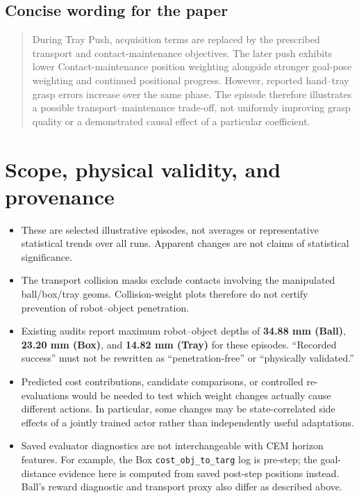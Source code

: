 \documentclass[11pt,a4paper]{article}
\begin{document}
\subsection{Concise wording for the paper}

\begin{quote}
During Tray Push, acquisition terms are replaced by the prescribed transport and contact-maintenance objectives. The later push exhibits lower Contact-maintenance position weighting alongside stronger goal-pose weighting and continued positional progress. However, reported hand--tray grasp errors increase over the same phase. The episode therefore illustrates a possible transport--maintenance trade-off, not uniformly improving grasp quality or a demonstrated causal effect of a particular coefficient.
\end{quote}

\section{Scope, physical validity, and provenance}

\begin{itemize}
\item These are selected illustrative episodes, not averages or representative statistical trends over all runs. Apparent changes are not claims of statistical significance.
\item The transport collision masks exclude contacts involving the manipulated ball/box/tray geoms. Collision-weight plots therefore do not certify prevention of robot--object penetration.
\item Existing audits report maximum robot--object depths of \textbf{34.88 mm (Ball)}, \textbf{23.20 mm (Box)}, and \textbf{14.82 mm (Tray)} for these episodes. ``Recorded success'' must not be rewritten as ``penetration-free'' or ``physically validated.''
\item Predicted cost contributions, candidate comparisons, or controlled re-evaluations would be needed to test which weight changes actually cause different actions. In particular, some changes may be state-correlated side effects of a jointly trained actor rather than independently useful adaptations.
\item Saved evaluator diagnostics are not interchangeable with CEM horizon features. For example, the Box \texttt{cost\_obj\_to\_targ} log is pre-step; the goal-distance evidence here is computed from saved post-step positions instead. Ball's reward diagnostic and transport proxy also differ as described above.
\end{itemize}
\end{document}
